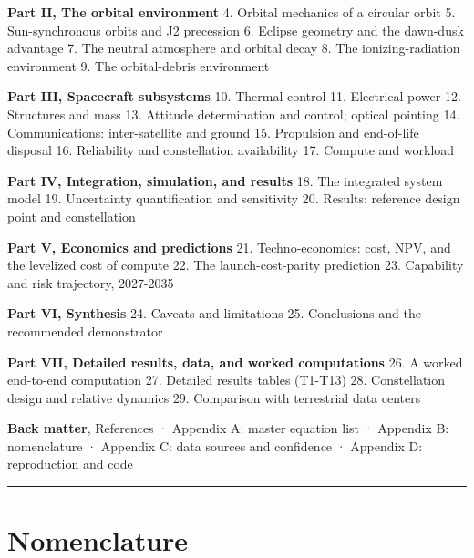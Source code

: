 \documentclass[
  11pt,
  openany,
  oneside]{book}
\begin{document}
\textbf{Part II, The orbital environment} 4. Orbital mechanics of a
circular orbit 5. Sun-synchronous orbits and J2 precession 6. Eclipse
geometry and the dawn-dusk advantage 7. The neutral atmosphere and
orbital decay 8. The ionizing-radiation environment 9. The
orbital-debris environment

\textbf{Part III, Spacecraft subsystems} 10. Thermal control 11.
Electrical power 12. Structures and mass 13. Attitude determination and
control; optical pointing 14. Communications: inter-satellite and ground
15. Propulsion and end-of-life disposal 16. Reliability and
constellation availability 17. Compute and workload

\textbf{Part IV, Integration, simulation, and results} 18. The
integrated system model 19. Uncertainty quantification and sensitivity
20. Results: reference design point and constellation

\textbf{Part V, Economics and predictions} 21. Techno-economics: cost,
NPV, and the levelized cost of compute 22. The launch-cost-parity
prediction 23. Capability and risk trajectory, 2027-2035

\textbf{Part VI, Synthesis} 24. Caveats and limitations 25. Conclusions
and the recommended demonstrator

\textbf{Part VII, Detailed results, data, and worked computations} 26. A
worked end-to-end computation 27. Detailed results tables (T1-T13) 28.
Constellation design and relative dynamics 29. Comparison with
terrestrial data centers

\textbf{Back matter}, References · Appendix A: master equation list ·
Appendix B: nomenclature · Appendix C: data sources and confidence ·
Appendix D: reproduction and code

\begin{center}\rule{0.5\linewidth}{0.5pt}\end{center}

\chapter{Nomenclature}\label{nomenclature}
\end{document}
